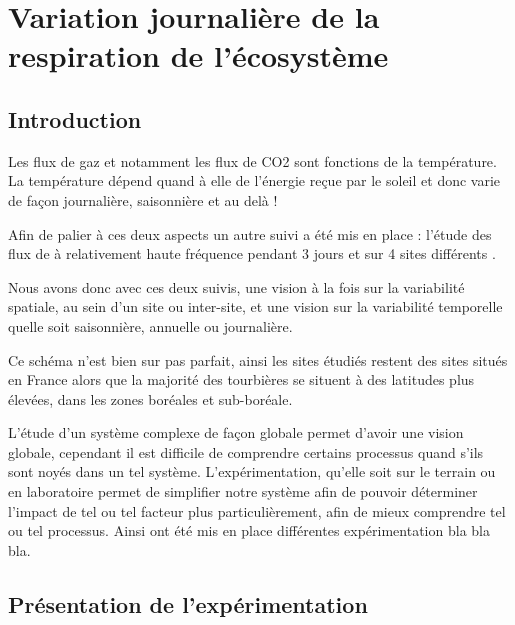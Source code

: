 \chapter{Variation journalière de la respiration de l'écosystème}
\newpage

\section{Introduction}
Les flux de gaz et notamment les flux de CO2 sont fonctions de la température.
La température dépend quand à elle de l'énergie reçue par le soleil et donc varie de façon journalière, saisonnière et au delà !

Afin de palier à ces deux aspects un autre suivi a été mis en place : l'étude des flux de \COO à relativement haute fréquence  pendant 3 jours et sur 4 sites différents .

Nous avons donc avec ces deux suivis, une vision à la fois sur la variabilité spatiale, au sein d'un site ou inter-site, et une vision sur la variabilité temporelle quelle soit saisonnière, annuelle ou journalière.

Ce schéma n'est bien sur pas parfait, ainsi les sites étudiés restent des sites situés en France alors que la majorité des tourbières se situent à des latitudes plus élevées, dans les zones boréales et sub-boréale.


L'étude d'un système complexe de façon globale permet d'avoir une vision globale, cependant il est difficile de comprendre certains processus quand s'ils sont noyés dans un tel système. 
L'expérimentation, qu'elle soit sur le terrain ou en laboratoire permet de simplifier notre système afin de pouvoir déterminer l'impact de tel ou tel facteur plus particulièrement, afin de mieux comprendre tel ou tel processus.
Ainsi ont été mis en place différentes expérimentation bla bla bla.

\section{Présentation de l'expérimentation}

